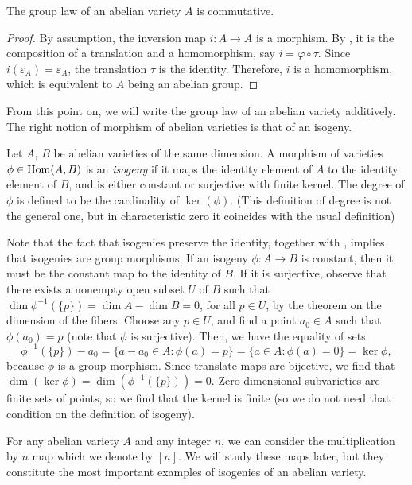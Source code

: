 \begin{corollary}
	The group law of an abelian variety $A$ is commutative.
\end{corollary}
\begin{proof}
	By assumption, the inversion map $i:A\rightarrow A$ is a morphism. By , it is the composition of a translation and a homomorphism, say $i=\varphi\circ\tau$. Since $i(\varepsilon_A)=\varepsilon_A$, the translation $\tau$ is the identity. Therefore, $i$ is a homomorphism, which is equivalent to $A$ being an abelian group.
\end{proof}
From this point on, we will write the group law of an abelian variety additively. The right notion of morphism of abelian varieties is that of an isogeny.
\begin{definition}
	Let $A$, $B$ be abelian varieties of the same dimension. A morphism of varieties $\phi\in\operatorname{Hom}(A,B)$ is an \emph{isogeny} if it maps the identity element of $A$ to the identity element of $B$, and is either constant or surjective with finite kernel. The degree of $\phi$ is defined to be the cardinality of $\ker(\phi)$. (This definition of degree is not the general one, but in characteristic zero it coincides with the usual definition)
\end{definition}
Note that the fact that isogenies preserve the identity, together with , implies that isogenies are group morphisms. If an isogeny $\phi:A\rightarrow B$ is constant, then it must be the constant map to the identity of $B$. If it is surjective, observe that there exists a nonempty open subset $U$ of $B$ such that $\dim{\phi^{-1}}(\{p\})=\dim A-\dim B=0$, for all $p\in U$, by the theorem on the dimension of the fibers. Choose any $p\in U$, and find a point $a_0\in A$ such that $\phi(a_0)=p$ (note that $\phi$ is surjective). Then, we have the equality of sets
\begin{equation*}
	\phi^{-1}(\{p\})-a_0=\{a-a_0\in A:\phi(a)=p\}=\{a\in A:\phi(a)=0\}=\ker\phi,
\end{equation*}
because $\phi$ is a group morphism. Since translate maps are bijective, we find that $\dim(\ker\phi)=\dim(\phi^{-1}(\{p\}))=0$. Zero dimensional subvarieties are finite sets of points, so we find that the kernel is finite (so we do not need that condition on the definition of isogeny).

For any abelian variety $A$ and any integer $n$, we can consider the multiplication by $n$ map which we denote by $[n]$. We will study these maps later, but they constitute the most important examples of isogenies of an abelian variety.

